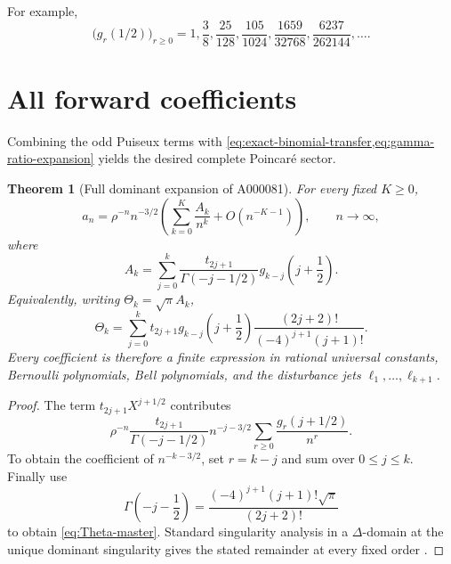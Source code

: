 \documentclass[11pt,a4paper,oneside,openany]{book}
\newtheorem{theorem}{Theorem}[chapter]
\theoremstyle{definition}
\theoremstyle{remark}
\begin{document}
For example,
\begin{equation}
 \bigl(g_r(1/2)\bigr)_{r\ge0}
 =1,\frac38,\frac{25}{128},\frac{105}{1024},
   \frac{1659}{32768},\frac{6237}{262144},\ldots .
 \label{eq:g-half}
\end{equation}

\section{All forward coefficients}
Combining the odd Puiseux terms with
\cref{eq:exact-binomial-transfer,eq:gamma-ratio-expansion} yields the desired
complete Poincar\'e sector.

\begin{theorem}[Full dominant expansion of A000081]
\label{thm:full-forward}
For every fixed $K\ge0$,
\begin{equation}
 a_n=\rho^{-n}n^{-3/2}
 \left(\sum_{k=0}^{K}\frac{A_k}{n^k}
 +O(n^{-K-1})\right),
 \qquad n\to\infty,
 \label{eq:forward-A}
\end{equation}
where
\begin{equation}
 \boxed{
 A_k=\sum_{j=0}^{k}
 \frac{t_{2j+1}}{\Gamma(-j-1/2)}
 g_{k-j}\!\left(j+\frac12\right).}
 \label{eq:Ak-master}
\end{equation}
Equivalently, writing $\Theta_k=\sqrt\pi A_k$,
\begin{equation}
 \boxed{
 \Theta_k=\sum_{j=0}^{k}
 t_{2j+1}g_{k-j}\!\left(j+\frac12\right)
 \frac{(2j+2)!}{(-4)^{j+1}(j+1)!}.}
 \label{eq:Theta-master}
\end{equation}
Every coefficient is therefore a finite expression in rational universal
constants, Bernoulli polynomials, Bell polynomials, and the disturbance jets
$\ell_1,\ldots,\ell_{k+1}$.
\end{theorem}

\begin{proof}
The term $t_{2j+1}X^{j+1/2}$ contributes
\[
 \rho^{-n}\frac{t_{2j+1}}{\Gamma(-j-1/2)}
 n^{-j-3/2}\sum_{r\ge0}\frac{g_r(j+1/2)}{n^r}.
\]
To obtain the coefficient of $n^{-k-3/2}$, set $r=k-j$ and sum over
$0\le j\le k$.  Finally use
\[
 \Gamma\!\left(-j-\frac12\right)
 =\frac{(-4)^{j+1}(j+1)!\sqrt\pi}{(2j+2)!}
\]
to obtain \cref{eq:Theta-master}.  Standard singularity analysis in a
$\Delta$-domain at the unique dominant singularity gives the stated remainder
at every fixed order \cite{FlajoletOdlyzko1990,Genitrini2016}.
\end{proof}
\end{document}
